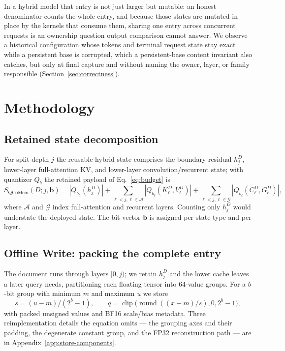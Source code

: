 \documentclass{article}
\begin{document}
In a hybrid model that entry is not just larger but mutable: an honest
denominator counts the whole entry, and because those states are mutated in
place by the kernels that consume them, sharing one entry across concurrent
requests is an ownership question output comparison cannot answer. We observe
a historical configuration whose tokens and terminal request state stay exact
while a persistent base is corrupted, which a persistent-base content
invariant also catches, but only at final capture and without naming the
owner, layer, or family responsible (Section~\ref{sec:correctness}).

\section{Methodology}
\label{sec:method}

\subsection{Retained state decomposition}
\label{sec:decomposition}

For split depth $j$ the reusable hybrid state comprises the boundary residual
$h_j^D$, lower-layer full-attention KV, and lower-layer convolution/recurrent
state; with quantizer $Q_b$ the retained payload of Eq.~\ref{eq:budget} is
\begin{equation}
 S_{\mathrm{QCoMem}}(D;j,\mathbf b)=|Q_{b_h}(h_j^D)|+
 \sum_{\ell<j,\ell\in\mathcal A}|Q_{b_\ell}(K^D_\ell,V^D_\ell)|+
 \sum_{\ell<j,\ell\in\mathcal G}|Q_{b_\ell}(C^D_\ell,G^D_\ell)|,
\end{equation}
where $\mathcal A$ and $\mathcal G$ index full-attention and recurrent layers.
Counting only $h_j^D$ would understate the deployed state.  The bit vector $\mathbf b$ is assigned per state type and per layer.

\subsection{Offline Write: packing the complete entry}
\label{sec:write}

The document runs through layers $[0,j)$; we retain $h_j^D$ and the lower cache
leaves a later query needs, partitioning each floating tensor into 64-value
groups.  For a $b$-bit group with minimum $m$ and maximum $u$ we store
\begin{equation}
 s=(u-m)/(2^b-1),\qquad q=\operatorname{clip}
 \bigl(\operatorname{round}((x-m)/s),0,2^b-1\bigr),
 \label{eq:quant}
\end{equation}
with packed unsigned values and BF16 scale/bias metadata.  Three reimplementation details the equation omits --- the grouping axes and
their padding, the degenerate constant group, and the FP32 reconstruction path
--- are in Appendix~\ref{app:store-components}.
\end{document}
